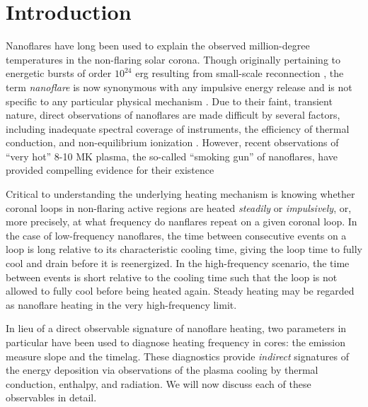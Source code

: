 \section{Introduction}\label{introduction}

Nanoflares have long been used to explain the observed million-degree temperatures in the non-flaring solar corona. Though originally pertaining to energetic bursts of order $10^{24}$ erg resulting from small-scale reconnection \citep{parker_nanoflares_1988}, the term \textit{nanoflare} is now synonymous with any impulsive energy release and is not specific to any particular physical mechanism \citep{klimchuk_key_2015}. Due to their faint, transient nature, direct observations of nanoflares are made difficult by several factors, including inadequate spectral coverage of instruments, the efficiency of thermal conduction, and non-equilibrium ionization \citep{cargill_implications_1994,winebarger_defining_2012,barnes_inference_2016}. However, recent observations of ``very hot'' 8-10 MK plasma, the so-called ``smoking gun'' of nanoflares, have provided compelling evidence for their existence \citep[e.g.][]{brosius_pervasive_2014,caspi_new_2015,parenti_spectroscopy_2017,ishikawa_detection_2017}

Critical to understanding the underlying heating mechanism is knowing whether coronal loops in non-flaring active regions are heated \textit{steadily} or \textit{impulsively}, or, more precisely, at what frequency do nanflares repeat on a given coronal loop. In the case of low-frequency nanoflares, the time between consecutive events on a loop is long relative to its characteristic cooling time, giving the loop time to fully cool and drain before it is reenergized. In the high-frequency scenario, the time between events is short relative to the cooling time such that the loop is not allowed to fully cool before being heated again. Steady heating may be regarded as nanoflare heating in the very high-frequency limit.

In lieu of a direct observable signature of nanoflare heating, two parameters in particular have been used to diagnose heating frequency in \AR{} cores: the emission measure slope and the timelag. These diagnostics provide \textit{indirect} signatures of the energy deposition via observations of the plasma cooling by thermal conduction, enthalpy, and radiation. We will now discuss each of these observables in detail.

